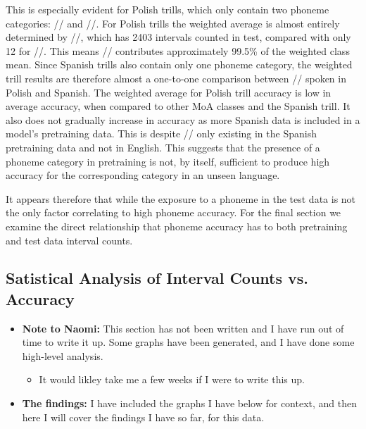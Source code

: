 This is especially evident for Polish trills, which only contain two phoneme categories: // and //. For Polish trills the weighted average is almost entirely determined by //, which has 2403 intervals counted in test, compared with only 12 for //. This means // contributes approximately 99.5\% of the weighted class mean. Since Spanish trills also contain only one phoneme category, the weighted trill results are therefore almost a one-to-one comparison between // spoken in Polish and Spanish. The weighted average for Polish trill accuracy is low in average accuracy, when compared to other MoA classes and the Spanish trill. It also does not gradually increase in accuracy as more Spanish data is included in a model's pretraining data. This is despite // only existing in the Spanish pretraining data and not in English. This suggests that the presence of a phoneme category in pretraining is not, by itself, sufficient to produce high accuracy for the corresponding category in an unseen language. %

It appears therefore that while the exposure to a phoneme in the test data is not the only factor correlating to high phoneme accuracy. For the final section we examine the direct relationship that phoneme accuracy has to both pretraining and test data interval counts.

\newpage    
\subsection{Satistical Analysis of Interval Counts vs. Accuracy}
\begin{itemize}
    \item \textbf{Note to Naomi:} This section has not been written and I have run out of time to write it up. Some graphs have been generated, and I have done some high-level analysis.
    \begin{itemize}
        \item It would likley take me a few weeks if I were to write this up.
    \end{itemize}
    
    \item \textbf{The findings:} I have included the graphs I have below for context, and then here I will cover the findings I have so far, for this data.
    
\end{itemize}

